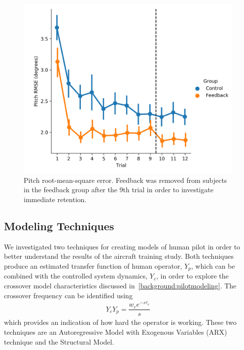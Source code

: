 \begin{figure}[tb]
    \centering
    \includegraphics[width=0.8\linewidth]{figures/Modeling/prms_arx.png}
    \caption[Pitch root-mean-square error]{Pitch root-mean-square error. Feedback was removed from subjects in the feedback group after the 9th trial in order to investigate immediate retention.}
    \label{fig:prmse}
\end{figure}

\subsection{Modeling Techniques}
We investigated two techniques for creating models of human pilot in order to better understand the results of the aircraft training study.
Both techniques produce an estimated transfer function of human operator, $Y_p$, which can be combined with the controlled system dynamics, $Y_c$, in order to explore the crossover model characteristics discussed in~\ref{background:pilotmodeling}.
The crossover frequency can be identified using
\begin{align}
    Y_c Y_p = \dfrac{w_c e^{-s \tau_e}}{s}
\end{align}
which provides an indication of how hard the operator is working.
These two techniques are an Autoregressive Model with Exogenous Variables (ARX) technique and the Structural Model.

